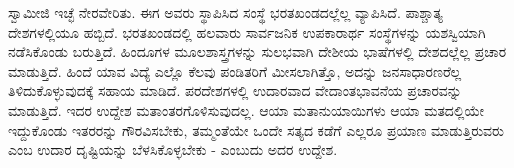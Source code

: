  ಸ್ವಾಮೀಜಿ ಇಚ್ಛೆ ನೇರವೇರಿತು. ಈಗ ಅವರು ಸ್ಥಾಪಿಸಿದ ಸಂಸ್ಥೆ ಭರತಖಂಡದಲ್ಲೆಲ್ಲ ವ್ಯಾಪಿಸಿದೆ. ಪಾಶ್ಚಾತ್ಯ ದೇಶಗಳಲ್ಲಿಯೂ ಹಬ್ಬಿದೆ. ಭರತಖಂಡದಲ್ಲಿ ಹಲವಾರು ಸಾರ್ವಜನಿಕ ಉಪಕಾರಾರ್ಥ ಸಂಸ್ಥೆಗಳನ್ನು ಯಶಸ್ವಿಯಾಗಿ ನಡೆಸಿಕೊಂಡು ಬರುತ್ತಿದೆ. ಹಿಂದೂಗಳ ಮೂಲಶಾಸ್ತ್ರಗಳನ್ನು ಸುಲಭವಾಗಿ ದೇಶೀಯ ಭಾಷೆಗಳಲ್ಲಿ ದೇಶದಲ್ಲೆಲ್ಲ ಪ್ರಚಾರ ಮಾಡುತ್ತಿದೆ. ಹಿಂದೆ ಯಾವ ವಿದ್ಯೆ ಎಲ್ಲೊ ಕೆಲವು ಪಂಡಿತರಿಗೆ ಮೀಸಲಾಗಿತ್ತೊ, ಅದನ್ನು ಜನಸಾಧಾರಣರೆಲ್ಲ ತಿಳಿದುಕೊಳ್ಳುವುದಕ್ಕೆ ಸಹಾಯ ಮಾಡಿದೆ. ಪರದೇಶಗಳಲ್ಲಿ ಉದಾರವಾದ ವೇದಾಂತಭಾವನೆಯ ಪ್ರಚಾರವನ್ನು ಮಾಡುತ್ತಿದೆ. ಇದರ ಉದ್ದೇಶ ಮತಾಂತರಗೊಳಿಸುವುದಲ್ಲ. ಆಯಾ ಮತಾನುಯಾಯಿಗಳು ಆಯಾ ಮತದಲ್ಲಿಯೇ ಇದ್ದುಕೊಂಡು ಇತರರನ್ನು ಗೌರವಿಸಬೇಕು, ತಮ್ಮಂತೆಯೇ ಒಂದೇ ಸತ್ಯದ ಕಡೆಗೆ ಎಲ್ಲರೂ ಪ್ರಯಾಣ ಮಾಡುತ್ತಿರುವರು ಎಂಬ ಉದಾರ ದೃಷ್ಟಿಯನ್ನು ಬೆಳಸಿಕೊಳ್ಳಬೇಕು - ಎಂಬುದು ಅದರ ಉದ್ದೇಶ. 

